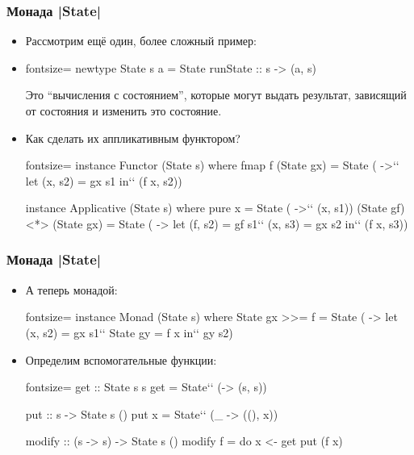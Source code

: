 \documentclass[11pt]{beamer}
\begin{document}
\begin{frame}[fragile]
\frametitle{Монада \haskinline|State|}
\begin{itemize}
    \item Рассмотрим ещё один, более сложный пример:
    \item
    \begin{haskell*}{fontsize=\footnotesize}
    newtype State s a = State { runState :: s -> (a, s) }
    \end{haskell*}
    Это \enquote{вычисления с состоянием}, которые могут выдать результат, зависящий от состояния и изменить это состояние.
    \item Как сделать их аппликативным функтором?
    \begin{haskell*}{fontsize=\footnotesize}
    instance Functor (State s) where
      fmap f (State gx) = State ( ->`\pause` 
        let (x, s2) = gx s1
        in`\pause` (f x, s2))
 
    instance Applicative (State s) where
      pure x = State ( ->`\pause` (x, s1))
      (State gf) <*> (State gx) = State ( ->
        let (f, s2) = gf s1`\pause`
            (x, s3) = gx s2
        in`\pause` (f x, s3))
   \end{haskell*}    
\end{itemize}
\end{frame}

\begin{frame}[fragile]
\frametitle{Монада \haskinline|State|}
\begin{itemize}
    \item А теперь монадой:
    \begin{haskell*}{fontsize=\footnotesize}
    instance Monad (State s) where
      State gx >>= f = State ( ->
        let (x, s2) = gx s1`\pause`
            State gy = f x
        in`\pause` gy s2)
    \end{haskell*} 
    \pause
    \item Определим вспомогательные функции:
    \begin{haskell*}{fontsize=\footnotesize}
    get :: State s s
    get = State`\pause` (\s -> (s, s))

    put :: s -> State s ()
    put x = State`\pause` (\_ -> ((), x))
    
    modify :: (s -> s) -> State s ()
    modify f = do x <- get
                  put (f x)
    \end{haskell*} 
\end{itemize}
\end{frame}
\end{document}
